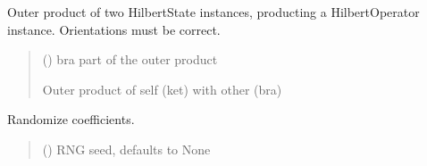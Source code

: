 \documentclass[letterpaper,10pt,english]{sphinxmanual}
\begin{document}
\begin{fulllineitems}
\begin{fulllineitems}
\label{\detokenize{spinbox:spinbox.core.HilbertState.outer}}
\pysigstartsignatures
{}
\pysigstopsignatures
\sphinxAtStartPar
Outer product of two HilbertState instances, producting a HilbertOperator instance. Orientations must be correct.
\begin{quote}\begin{description}
\sphinxAtStartPar
{} ({\hyperref[\detokenize{spinbox:spinbox.core.HilbertState}]{}}) \textendash{} bra part of the outer product

\sphinxAtStartPar
Outer product of self (ket) with other (bra)

\sphinxAtStartPar
{\hyperref[\detokenize{spinbox:spinbox.core.HilbertOperator}]{}}

\end{description}\end{quote}

\end{fulllineitems}


\begin{fulllineitems}
\label{\detokenize{spinbox:spinbox.core.HilbertState.randomize}}
\pysigstartsignatures
{}
\pysigstopsignatures
\sphinxAtStartPar
Randomize coefficients.
\begin{quote}\begin{description}
\sphinxAtStartPar
{} (\sphinxstyleliteralemphasis{\sphinxupquote{, }}) \textendash{} RNG seed, defaults to None


\end{description}
\end{quote}
\end{fulllineitems}
\end{fulllineitems}
\end{document}
